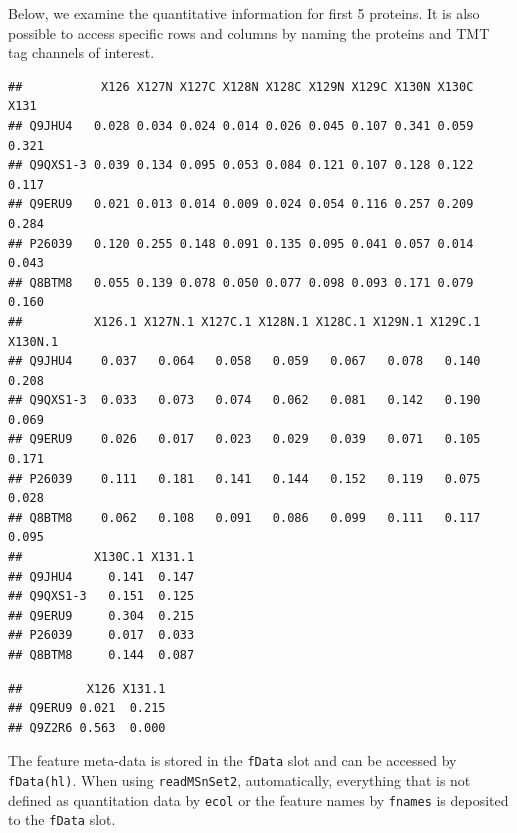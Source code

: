 Below, we examine the quantitative information for first 5 proteins.
It is also possible to access specific rows and columns by naming the
proteins and TMT tag channels of interest. 

\begin{knitrout}
\color{fgcolor}\begin{kframe}
\begin{alltt}
\hlstd{(hl)[}\hlopt{:}\hlstd{, ]}
\end{alltt}
\begin{verbatim}
##           X126 X127N X127C X128N X128C X129N X129C X130N X130C  X131
## Q9JHU4   0.028 0.034 0.024 0.014 0.026 0.045 0.107 0.341 0.059 0.321
## Q9QXS1-3 0.039 0.134 0.095 0.053 0.084 0.121 0.107 0.128 0.122 0.117
## Q9ERU9   0.021 0.013 0.014 0.009 0.024 0.054 0.116 0.257 0.209 0.284
## P26039   0.120 0.255 0.148 0.091 0.135 0.095 0.041 0.057 0.014 0.043
## Q8BTM8   0.055 0.139 0.078 0.050 0.077 0.098 0.093 0.171 0.079 0.160
##          X126.1 X127N.1 X127C.1 X128N.1 X128C.1 X129N.1 X129C.1 X130N.1
## Q9JHU4    0.037   0.064   0.058   0.059   0.067   0.078   0.140   0.208
## Q9QXS1-3  0.033   0.073   0.074   0.062   0.081   0.142   0.190   0.069
## Q9ERU9    0.026   0.017   0.023   0.029   0.039   0.071   0.105   0.171
## P26039    0.111   0.181   0.141   0.144   0.152   0.119   0.075   0.028
## Q8BTM8    0.062   0.108   0.091   0.086   0.099   0.111   0.117   0.095
##          X130C.1 X131.1
## Q9JHU4     0.141  0.147
## Q9QXS1-3   0.151  0.125
## Q9ERU9     0.304  0.215
## P26039     0.017  0.033
## Q8BTM8     0.144  0.087
\end{verbatim}
\begin{alltt}
\hlstd{(hl)[}\hlstd{(}\hlstd{,} \hlstd{),} \hlstd{(}\hlstd{,} \hlstd{)]}
\end{alltt}
\begin{verbatim}
##         X126 X131.1
## Q9ERU9 0.021  0.215
## Q9Z2R6 0.563  0.000
\end{verbatim}
\end{kframe}
\end{knitrout}

The feature meta-data is stored in the \texttt{fData} slot and can be
accessed by \texttt{fData(hl)}. When using \texttt{readMSnSet2}, automatically,
everything that is not defined as quantitation data by \texttt{ecol} or the
feature names by \texttt{fnames} is deposited to the \texttt{fData} slot. 

